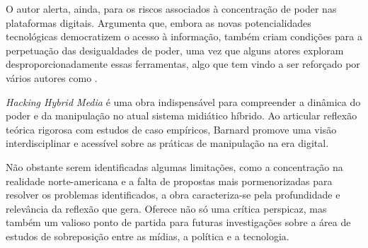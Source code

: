 \documentclass[portuguese]{textolivre}
\begin{document}
O autor alerta, ainda, para os riscos associados à concentração de poder nas plataformas digitais. Argumenta que, embora as novas potencialidades tecnológicas democratizem o acesso à informação, também criam condições para a perpetuação das desigualdades de poder, uma vez que alguns atores exploram desproporcionadamente essas ferramentas, algo que tem vindo a ser reforçado por vários autores como \textcite{nielsen2022}.

\textit{Hacking Hybrid Media} é uma obra indispensável para compreender a dinâmica do poder e da manipulação no atual sistema midiático híbrido. Ao articular reflexão teórica rigorosa com estudos de caso empíricos, Barnard promove uma visão interdisciplinar e acessível sobre as práticas de manipulação na era digital.

Não obstante serem identificadas algumas limitações, como a concentração na realidade norte-americana e a falta de propostas mais pormenorizadas para resolver os problemas identificados, a obra caracteriza-se pela profundidade e relevância da reflexão que gera. Oferece não só uma crítica perspicaz, mas também um valioso ponto de partida para futuras investigações sobre a área de estudos de sobreposição entre as mídias, a política e a tecnologia.


\printbibliography\label{sec-bib}
\end{document}
